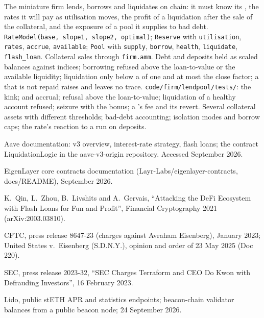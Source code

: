 \begin{build}
 The miniature firm lends, borrows and liquidates on chain: it must know its , the rates it will pay as utilisation moves,
the profit of a liquidation after the sale of the collateral, and the exposure of a pool it supplies to bad debt.
 \texttt{RateModel(base, slope1, slope2, optimal)}; \texttt{Reserve} with \texttt{utilisation}, \texttt{rates}, \texttt{accrue},
\texttt{available}; \texttt{Pool} with \texttt{supply}, \texttt{borrow}, \texttt{health}, \texttt{liquidate}, \texttt{flash\_loan}. Collateral sales through
\texttt{firm.amm}.
 Debt and deposits held as scaled balances against indices; borrowing refused above the loan-to-value or the available liquidity; liquidation
only below a  of one and at most the close factor; a  that is not repaid raises and leaves no trace.
 \texttt{code/firm/lendpool/tests/}: the kink;  and accrual; refusal above the loan-to-value; liquidation of a healthy
account refused; seizure with the bonus; a 's fee and its revert.
 Several collateral assets with different thresholds; bad-debt accounting; isolation modes and borrow caps; the rate's reaction to a run on
deposits.
\end{build}

\begin{omsources}
\item Aave documentation: v3 overview, interest-rate strategy, flash loans; the contract LiquidationLogic in the aave-v3-origin repository. Accessed September 2026.
\item EigenLayer core contracts documentation (Layr-Labs/eigenlayer-contracts, docs/README), September 2026.
\item K.~Qin, L.~Zhou, B.~Livshits and A.~Gervais, ``Attacking the DeFi Ecosystem with Flash Loans for Fun and Profit'', Financial Cryptography 2021
(arXiv:2003.03810).
\item CFTC, press release 8647-23 (charges against Avraham Eisenberg), January 2023; United States v.\ Eisenberg (S.D.N.Y.), opinion and order of 23
May 2025 (Doc 220).
\item SEC, press release 2023-32, ``SEC Charges Terraform and CEO Do Kwon with Defrauding Investors'', 16 February 2023.
\item Lido, public stETH APR and statistics endpoints; beacon-chain validator balances from a public beacon node; 24 September 2026.
\end{omsources}

